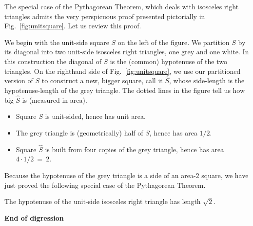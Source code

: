 
The special case of the Pythagorean Theorem, which deals with
isosceles right triangles admits the very perspicuous proof presented
pictorially in Fig.~\ref{fig:unitsquare}.  Let us review this proof.

We begin with the unit-side square $S$ on the left of the figure.  We
partition $S$ by its diagonal into two unit-side isosceles right
triangles, one grey and one white.  In this construction the diagonal
of $S$ is the (common) hypotenuse of the two triangles.  On the
righthand side of Fig.~\ref{fig:unitsquare}, we use our partitioned
version of $S$ to construct a new, bigger square, call it
$\widehat{S}$, whose side-length is the hypotenuse-length of the grey
triangle.  The dotted lines in the figure tell us how big
$\widehat{S}$ is (measured in area).
\begin{itemize}
\item
Square $S$ is unit-sided, hence has unit area.
\item
The grey triangle is (geometrically) half of $S$, hence has area
$1/2$.
\item
Square $\widehat{S}$ is built from four copies of the grey
triangle, hence has area $4 \cdot 1/2 \ = \ 2$.
\end{itemize}
Because the hypotenuse of the grey triangle is a side of an area-$2$
square, we have just proved the following special case of the
Pythagorean Theorem.

\begin{prop}
\label{thm:unit-isosceles-PythThm}
The hypotenuse of the unit-side isosceles right triangle has length
$\sqrt{2}$.
\end{prop}
  
\noindent \textbf{End of digression}

\bigskip
  
